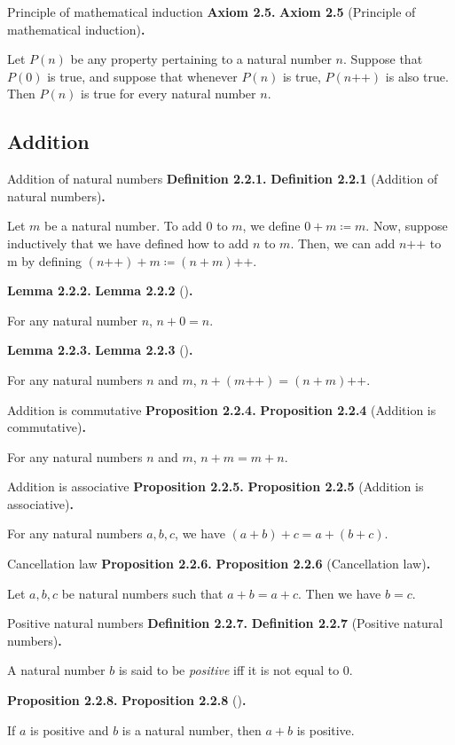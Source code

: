 \documentclass[12pt]{article}
\newcommand{\succr}[1]{#1 \textrm{++}}
\newenvironment{df}[2][\relax]{
\vspace{4mm}
    \noindent\setlength{\parskip}{1em}%
    \ifx#1\relax%
        \textbf{#2. }%
    \else%
        \textbf{#2} (#1)\textbf{. }%
    \fi%
    \ignorespaces%
}{}
\theoremstyle{remark}
\begin{document}
\begin{df}[Principle of mathematical induction]{Axiom 2.5}
    Let $P(n)$ be any property pertaining to a natural number $n$.
    Suppose that $P(0)$ is true, and suppose that whenever $P(n)$ is true, $P(\succr{n})$ is also true.
    Then $P(n)$ is true for every natural number $n$.
\end{df}


\subsection{Addition}

\begin{df}[Addition of natural numbers]{Definition 2.2.1}
    Let $m$ be a natural number.
    To add $0$ to $m$, we define $0 + m \coloneqq m$.
    Now, suppose inductively that we have defined how to add $n$ to $m$.
    Then, we can add $\succr{n}$ to m by defining $(\succr{n}) + m \coloneqq \succr{(n + m)}$.%
\end{df}


\begin{df}{Lemma 2.2.2}
    For any natural number $n$, $n + 0 = n$.
\end{df}


\begin{df}{Lemma 2.2.3}
    For any natural numbers $n$ and $m$, $n + (\succr{m}) = \succr{(n + m)}$.
\end{df}


\begin{df}[Addition is commutative]{Proposition 2.2.4}
    For any natural numbers $n$ and $m$, $n + m = m + n$.
\end{df}


\begin{df}[Addition is associative]{Proposition 2.2.5}
    For any natural numbers $a, b, c$, we have $(a + b) + c = a +(b + c)$.
\end{df}


\begin{df}[Cancellation law]{Proposition 2.2.6}
    Let $a, b, c$ be natural numbers such that $a + b = a + c$.
    Then we have $b = c$.
\end{df}


\begin{df}[Positive natural numbers]{Definition 2.2.7}
    A natural number $b$ is said to be \emph{positive} iff it is not equal to $0$.    
\end{df}


\begin{df}{Proposition 2.2.8}
    If $a$ is positive and $b$ is a natural number, then $a + b$ is positive.
\end{df}
\end{document}
